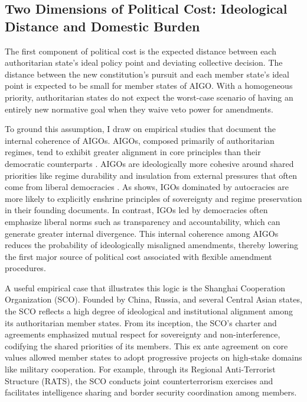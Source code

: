 \documentclass[12pt]{article}
\begin{document}
\subsection{Two Dimensions of Political Cost: Ideological Distance and Domestic Burden}

The first component of political cost is the expected distance between each authoritarian state's ideal policy point and deviating collective decision. The distance between the new constitution's pursuit and each member state's ideal point is expected to be small for member states of AIGO. With a homogeneous priority, authoritarian states do not expect the worst-case scenario of having an entirely new normative goal when they waive veto power for amendments.

To ground this assumption, I draw on empirical studies that document the internal coherence of AIGOs. AIGOs, composed primarily of authoritarian regimes, tend to exhibit greater alignment in core principles than their democratic counterparts \parencite{obydenkova_authoritarian_2019}. AIGOs are ideologically more cohesive around shared priorities like regime durability and insulation from external pressures that often come from liberal democracies \parencite{debre_are_2025}. As \textcite{ginsburg} shows, IGOs dominated by autocracies are more likely to explicitly enshrine principles of sovereignty and regime preservation in their founding documents. In contrast, IGOs led by democracies often emphasize liberal norms such as transparency and accountability, which can generate greater internal divergence. This internal coherence among AIGOs reduces the probability of ideologically misaligned amendments, thereby lowering the first major source of political cost associated with flexible amendment procedures.

A useful empirical case that illustrates this logic is the Shanghai Cooperation Organization (SCO). Founded by China, Russia, and several Central Asian states, the SCO reflects a high degree of ideological and institutional alignment among its authoritarian member states. From its inception, the SCO's charter and agreements emphasized mutual respect for sovereignty and non-interference, codifying the shared priorities of its members. This ex ante agreement on core values allowed member states to adopt progressive projects on high-stake domains like military cooperation. For example, through its Regional Anti-Terrorist Structure (RATS), the SCO conducts joint counterterrorism exercises and facilitates intelligence sharing and border security coordination among members.
\end{document}
